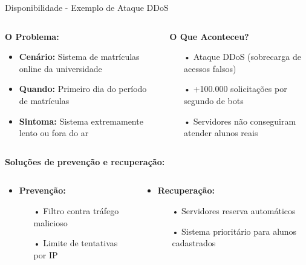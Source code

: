 \begin{frame}{Disponibilidade - Exemplo de Ataque DDoS}
  \begin{columns}[T]
    \begin{column}{0.48\textwidth}
      \begin{block}{\textbf{O Problema:}}
        \begin{itemize}
          \item \textbf{Cenário:} Sistema de matrículas online da universidade
          \item \textbf{Quando:} Primeiro dia do período de matrículas
          \item \textbf{Sintoma:} Sistema extremamente lento ou fora do ar
        \end{itemize}
      \end{block}
    \end{column}
    
    \begin{column}{0.48\textwidth}
      \begin{exampleblock}{\textbf{O Que Aconteceu?}}
        \begin{itemize}
          \item[•] Ataque DDoS (sobrecarga de acessos falsos)
          \item[•] +100.000 solicitações por segundo de bots
          \item[•] Servidores não conseguiram atender alunos reais
        \end{itemize}
      \end{exampleblock}
    \end{column}
  \end{columns}

  \begin{block}{\textbf{Soluções de prevenção e recuperação:}}
    \begin{columns}
      \begin{column}{0.5\textwidth}
      \begin{itemize}
          \item \textbf{Prevenção:}
        \begin{itemize}
          \item[•] Filtro contra tráfego malicioso
          \item[•] Limite de tentativas por IP
        \end{itemize}
      \end{itemize}
        
      \end{column}
      \begin{column}{0.5\textwidth}
      \begin{itemize}
          \item \textbf{Recuperação:}
        \begin{itemize}
          \item[•] Servidores reserva automáticos
          \item[•] Sistema prioritário para alunos cadastrados
        \end{itemize}
      \end{itemize}
        

\end{column}
\end{columns}
\end{block}
\end{frame}
